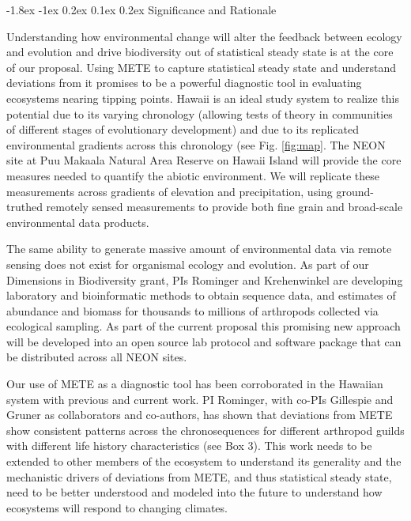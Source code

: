 \documentclass[11pt]{article}
\makeatletter
\renewcommand\subsection{\@startsection{subsection}{1}{\z@}%
                                  {-1.8ex \@plus -1ex \@minus 0.2ex}%
                                  {0.1ex \@plus 0.2ex}%
                                  {\normalfont\large\bfseries}}
\makeatother
\begin{document}
\subsection{Significance and Rationale}


Understanding how environmental change will alter the feedback between
ecology and evolution and drive biodiversity out of statistical steady
state is at the core of our proposal.  Using METE to capture
statistical steady state and understand deviations from it promises to
be a powerful diagnostic tool in evaluating ecosystems nearing tipping
points.  Hawaii is an ideal study system to realize this potential due
to its varying chronology (allowing tests of theory in communities of
different stages of evolutionary development) and due to its
replicated environmental gradients across this chronology (see
Fig. \ref{fig:map}. The NEON site at Puu Makaala Natural Area Reserve
on Hawaii Island will provide the core measures needed to quantify the
abiotic environment.  We will replicate these measurements across
gradients of elevation and precipitation, using ground-truthed
remotely sensed measurements to provide both fine grain and
broad-scale environmental data products.

The same ability to generate massive amount of environmental data via
remote sensing does not exist for organismal ecology and evolution.
As part of our Dimensions in Biodiversity grant, PIs Rominger and
Krehenwinkel are developing laboratory and bioinformatic methods to
obtain sequence data, and estimates of abundance and biomass for
thousands to millions of arthropods collected via ecological sampling.
As part of the current proposal this promising new approach will be
developed into an open source lab protocol and software package that
can be distributed across all NEON sites.

Our use of METE as a diagnostic tool has been corroborated in the
Hawaiian system with previous and current work.  PI Rominger, with
co-PIs Gillespie and Gruner as collaborators and co-authors, has shown
that deviations from METE show consistent patterns across the
chronosequences for different arthropod guilds with different life
history characteristics (see Box 3).  This work needs to be extended
to other members of the ecosystem to understand its generality and the
mechanistic drivers of deviations from METE, and thus statistical
steady state, need to be better understood and modeled into the future
to understand how ecosystems will respond to changing climates.
\end{document}
